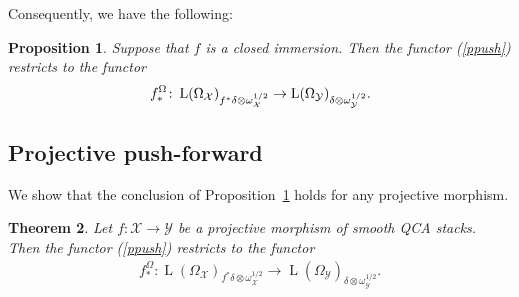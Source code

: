 \documentclass [11pt,oneside,a4paper,mathscr]{amsart}
\newtheorem{thm}{Theorem}[section]
\newtheorem{prop}[thm]{Proposition}
\theoremstyle{definition}
\newcommand{\Y}{\mathcal{Y}}
\newcommand{\LL}{\operatorname{L}}
\newcommand{\X}{\mathcal{X}}
\begin{document}
Consequently, we have the following: 
\begin{prop}\label{prop:push}
Suppose that $f$ is a closed immersion. Then the functor (\ref{ppush}) 
restricts to the functor 
    \begin{align}\notag
        f^{\Omega}_{*} \colon 
    \LL(\Omega_{\X})_{f^{\ast}\delta\otimes \omega_{\X}^{1/2}} \to \LL(\Omega_{\Y})_{\delta \otimes \omega_{\Y}^{1/2}}. 
    \end{align}
\end{prop}

\subsection{Projective push-forward}\label{subsec:push2}
We show that the conclusion of Proposition~\ref{prop:push} 
holds for any projective morphism. 
\begin{thm}\label{thm:proj}
Let $f \colon \X \to \Y$ be a projective morphism of smooth QCA stacks. 
Then the functor (\ref{ppush}) 
restricts to the functor 
    \begin{align}\label{funct:Lpush}
        f^{\Omega}_{*} \colon 
    \LL(\Omega_{\X})_{f^{\ast}\delta\otimes \omega_{\X}^{1/2}} \to \LL(\Omega_{\Y})_{\delta \otimes \omega_{\Y}^{1/2}}. 
    \end{align}
    \end{thm}
\end{document}
